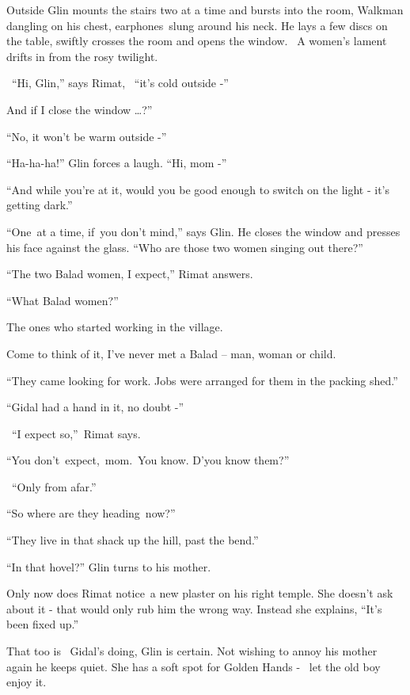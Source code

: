 \documentclass[letterpaper]{article}
\begin{document}
{Outside Glin }mounts the stairs
{two at a time and bursts into the room, Walkman dangling on his
chest, earphones~}slung{ around his neck. He lays a few discs on the
table, swiftly crosses the room and opens the window.~ A women's lament drifts in from the rosy twilight.}

{\ {}``}Hi,{ Glin,''
says Rimat, \ {}``it's cold outside -''}

{\textquotedbl}And if I{ close the window {\dots}?''}

{{}``No, it won't be warm outside -''}

{{}``Ha-ha-ha!'' Glin }forces a
laugh{. ``Hi, mom -'' }

{{}``And while you're at it, }would you be good enough to switch on the
light - {it's getting dark.''}

{{}``One~at a time, if~you }don't
mind{,'' says Glin. He closes the window and presses his face against
the glass}.{ ``Who are those
}two{ }{women singing out
there?''}

{{}``The two Balad women, I
}expect{,'' Rimat answers.}

{{}``What Balad women?''}

{\textquotedbl}The ones who started working{ in the
village.{\textquotedbl}\ \ \ \ \ \ \ \ }

{{\textquotedbl}Come to think of it, I've never met a Balad -- man,
woman }or child.{\textquotedbl}

{{}``They came looking for work. Jobs were arranged for them in the
packing }shed{.''}

{{}``Gidal had a hand in it, no doubt -''}

{~``}I expect
so{,''~Rimat says. }

{{}``You
don't~}expect,~mom{.~You know.
}D'y{ou know them?''}

{~``Only from afar.''}

{{}``So where are they heading~now?''}

{{}``They live in that shack up the hill,
}past{ the bend.''}

{{}``In that hovel?'' Glin turns }to his
mother{.}

{Only now does Rimat notice~a new }plaster
{on his right temple. She doesn't ask about
it}{ }{}- that would only rub him the wrong
way{. Instead she explains, ``It's been fixed up.''}

{That too is \ Gidal's doing, Glin is certain. Not wishing to annoy his
}mother{ again he keeps quiet. She has a soft spot for Golden Hands -
\ let the }old boy {enjoy it.}
\end{document}
